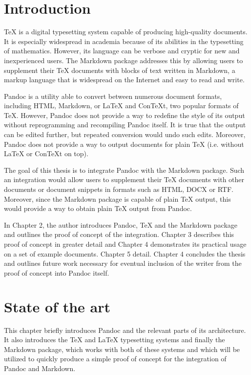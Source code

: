 \documentclass[
  digital,     %
  oneside,     %
  nosansbold,  %
  nocolorbold, %
  lof,         %
  nolot,       %
]{fithesis4}
\begin{document}

\chapter{Introduction}
\TeX{} is a digital typesetting system capable of producing high-quality documents. It is especially widespread in academia because of its abilities in the typesetting of mathematics. However, its language can be verbose and cryptic for new and inexperienced users. The Markdown package addresses this by allowing users to supplement their \TeX{} documents with blocks of text written in Markdown, a markup language that is widespread on the Internet and easy to read and write.

Pandoc is a utility able to convert between numerous document formats, including HTML, Markdown, or \LaTeX{} and Con\TeX{}t, two popular formats of \TeX{}. However, Pandoc does not provide a way to redefine the style of its output without reprogramming and recompiling Pandoc itself. It is true that the output can be edited further, but repeated conversion would undo such edits. Moreover, Pandoc does not provide a way to output documents for plain \TeX{} (i.e. without \LaTeX{} or Con\TeX{}t on top).

The goal of this thesis is to integrate Pandoc with the Markdown package. Such an integration would allow users to supplement their \TeX{} documents with other documents or document snippets in formats such as HTML, DOCX or RTF. Moreover, since the Markdown package is capable of plain \TeX{} output, this would provide a way to obtain plain \TeX{} output from Pandoc.

In Chapter 2, the author introduces Pandoc, \TeX{} and the Markdown package and outlines the proof of concept of the integration. Chapter 3 describes this proof of concept in greater
\ifexamples
  detail and Chapter 4 demonstrates its practical usage on a set of example documents. Chapter 5
\else
  detail. Chapter 4
\fi
concludes the thesis and outlines future work necessary for eventual inclusion of the writer from the proof of concept into Pandoc itself.

\chapter{State of the art}
This chapter briefly introduces Pandoc and the relevant parts of its architecture. It also introduces the \TeX{} and \LaTeX{} typesetting systems and finally the Markdown package, which works with both of these systems and which will be utilized to quickly produce a simple proof of concept for the integration of Pandoc and Markdown.
\end{document}
